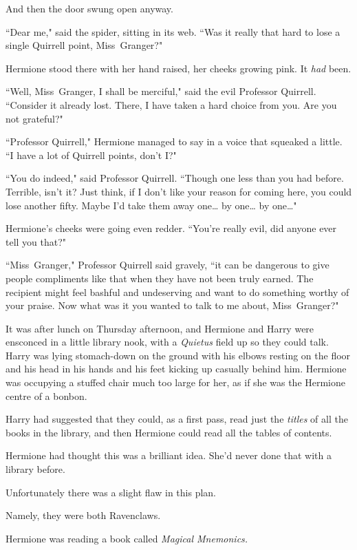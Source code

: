 And then the door swung open anyway.

``Dear me," said the spider, sitting in its web. ``Was it really that hard to lose a single Quirrell point, Miss~Granger?"

Hermione stood there with her hand raised, her cheeks growing pink. It \emph{had} been.

``Well, Miss~Granger, I shall be merciful," said the evil Professor Quirrell. ``Consider it already lost. There, I have taken a hard choice from you. Are you not grateful?"

``Professor Quirrell," Hermione managed to say in a voice that squeaked a little. ``I have a lot of Quirrell points, don't I?"

``You do indeed," said Professor Quirrell. ``Though one less than you had before. Terrible, isn't it? Just think, if I don't like your reason for coming here, you could lose another fifty. Maybe I'd take them away one{\ldots} by one{\ldots} by one{\ldots}"

Hermione's cheeks were going even redder. ``You're really evil, did anyone ever tell you that?"

``Miss~Granger," Professor Quirrell said gravely, ``it can be dangerous to give people compliments like that when they have not been truly earned. The recipient might feel bashful and undeserving and want to do something worthy of your praise. Now what was it you wanted to talk to me about, Miss~Granger?"

\later

It was after lunch on Thursday afternoon, and Hermione and Harry were ensconced in a little library nook, with a \emph{Quietus} field up so they could talk. Harry was lying stomach-down on the ground with his elbows resting on the floor and his head in his hands and his feet kicking up casually behind him. Hermione was occupying a stuffed chair much too large for her, as if she was the Hermione centre of a bonbon.

Harry had suggested that they could, as a first pass, read just the \emph{titles} of all the books in the library, and then Hermione could read all the tables of contents.

Hermione had thought this was a brilliant idea. She'd never done that with a library before.

Unfortunately there was a slight flaw in this plan.

Namely, they were both Ravenclaws.

Hermione was reading a book called \emph{Magical Mnemonics.}

